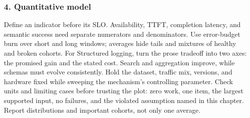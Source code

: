 \subsubsection*{4. Quantitative model}
Define an indicator before its SLO. Availability, TTFT, completion latency, and semantic success need separate numerators and denominators. Use error-budget burn over short and long windows; averages hide tails and mixtures of healthy and broken cohorts.
For Structured logging, turn the prose tradeoff into two axes: the promised gain and the stated cost. Search and aggregation improve, while schemas must evolve consistently. Hold the dataset, traffic mix, versions, and hardware fixed while sweeping the mechanism's controlling parameter.
Check units and limiting cases before trusting the plot: zero work, one item, the largest supported input, no failures, and the violated assumption named in this chapter. Report distributions and important cohorts, not only one average.
